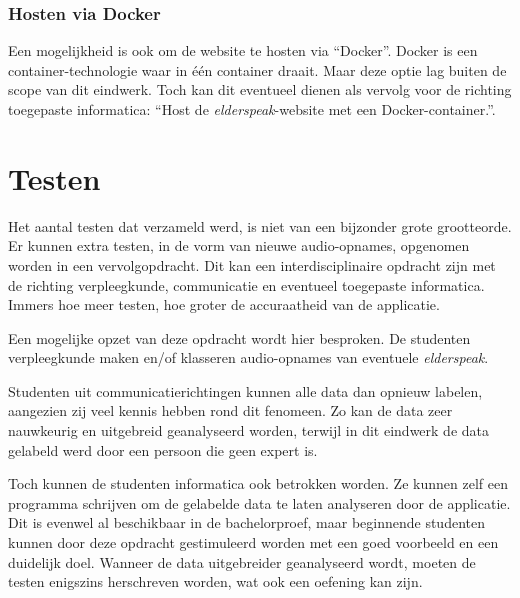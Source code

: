 \subsubsection{Hosten via Docker}
Een mogelijkheid is ook om de website te hosten via ``Docker''. Docker is een container-technologie waar in één container draait. Maar deze optie lag buiten de scope van dit eindwerk. Toch kan dit eventueel dienen als vervolg voor de richting toegepaste informatica: ``Host de \textit{elderspeak}-website met een Docker-container.''.

\section{Testen}
Het aantal testen dat verzameld werd, is niet van een bijzonder grote grootteorde. Er kunnen extra testen, in de vorm van nieuwe audio-opnames, opgenomen worden in een vervolgopdracht. Dit kan een interdisciplinaire opdracht zijn met de richting verpleegkunde, communicatie en eventueel toegepaste informatica. Immers hoe meer testen, hoe groter de accuraatheid van de applicatie.

Een mogelijke opzet van deze opdracht wordt hier besproken. De studenten verpleegkunde maken en/of klasseren audio-opnames van eventuele \textit{elderspeak}.

Studenten uit communicatierichtingen kunnen alle data dan opnieuw labelen, aangezien zij veel kennis hebben rond dit fenomeen. Zo kan de data zeer nauwkeurig en uitgebreid geanalyseerd worden, terwijl in dit eindwerk de data gelabeld werd door een persoon die geen expert is.

Toch kunnen de studenten informatica ook betrokken worden. Ze kunnen zelf een programma schrijven om de gelabelde data te laten analyseren door de applicatie. Dit is evenwel al beschikbaar in de bachelorproef, maar beginnende studenten kunnen door deze opdracht gestimuleerd worden met een goed voorbeeld en een duidelijk doel. Wanneer de data uitgebreider geanalyseerd wordt, moeten de testen enigszins herschreven worden, wat ook een oefening kan zijn.
